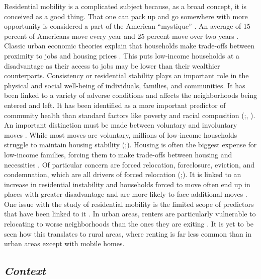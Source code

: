 Residential mobility is a complicated subject because, as a broad concept, it is conceived as a good thing. That one can pack up and go somewhere with more opportunity is considered a part of the American “mystique” \citep{molloy_internal_2011}. An average of 15 percent of Americans move every year and 25 percent move over two years \citep{bachmann_ins_2014}. Classic urban economic theories explain that households make trade-offs between proximity to jobs and housing prices \citep{hu_housing_2019}. This puts low-income households at a disadvantage as their access to jobs may be lower than their wealthier counterparts. Consistency or residential stability plays an important role in the physical and social well-being of individuals, families, and communities. It has been linked to a variety of adverse conditions and affects the neighborhoods being entered and left. It has been identified as a more important predictor of community health than standard factors like poverty and racial composition (\citealp{desmond_forced_2015};\citealp{desmond_housing_2016}, \citealp{rauh_housing_2008}). An important distinction must be made between voluntary and involuntary moves \citep{siskar_who_2019}. While most moves are voluntary, millions of low-income households struggle to maintain housing stability (\citealp{phinney_exploring_2013};\citealp{kang_why_2019}). Housing is often the biggest expense for low-income families, forcing them to make trade-offs between housing and necessities \citep{desmond_housing_2015}. Of particular concern are forced relocation, foreclosure, eviction, and condemnation, which are all drivers of forced relocation (\citealp{phinney_exploring_2013};\citealp{siskar_who_2019}). It is linked to an increase in residential instability and households forced to move often end up in places with greater disadvantage and are more likely to face additional moves \citep{desmond_forced_shell_2015}. One issue with the study of residential mobility is the limited scope of predictors that have been linked to it \citep{kang_why_2019}. In urban areas, renters are particularly vulnerable to relocating to worse neighborhoods than the ones they are exiting \citep{desmond_forced_2015}. It is yet to be seen how this translates to rural areas, where renting is far less common than in urban areas except with mobile homes. 

\subsection{\textit{Context}}

